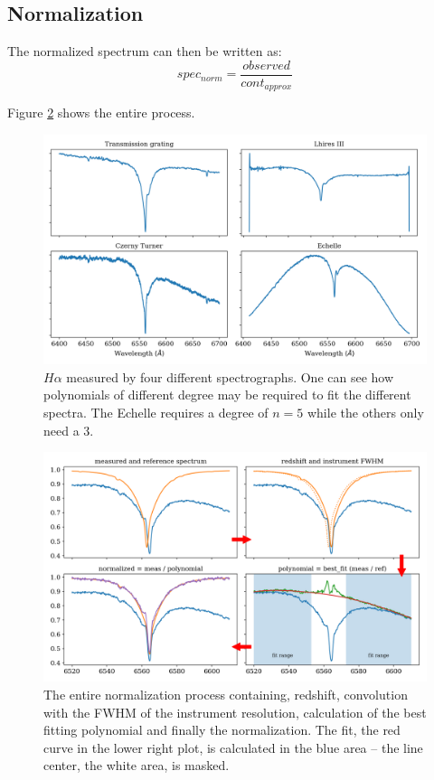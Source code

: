 \documentclass[10pt,a4paper,notitlepage,twocolumn]{article}
\begin{document}
\subsection{Normalization}
The normalized spectrum can then be written as:
\begin{equation}
	spec_{norm} = \frac{observed}{cont_{approx}}
\end{equation}

Figure \ref*{normalize_howto} shows the entire process.

\begin{figure}[h]
	\includegraphics[width=\columnwidth]{img/four_spectra_big.png}
	\caption{$H\alpha$ measured by four different spectrographs. One can see how polynomials of different degree may be required to fit the different spectra. The Echelle requires a degree of $n=5$ while the others only need a $3$.}
	\label{four_spectra}
\end{figure}

\begin{figure}[h]
	\includegraphics[width=\columnwidth]{img/normalize_howto.png}
	\caption{The entire normalization process containing, redshift, convolution with the FWHM of the instrument resolution, calculation of the best fitting polynomial and finally the normalization. The fit, the red curve in the lower right plot, is calculated in the blue area -- the line center, the white area, is masked.}
	\label{normalize_howto}
\end{figure}
\end{document}

